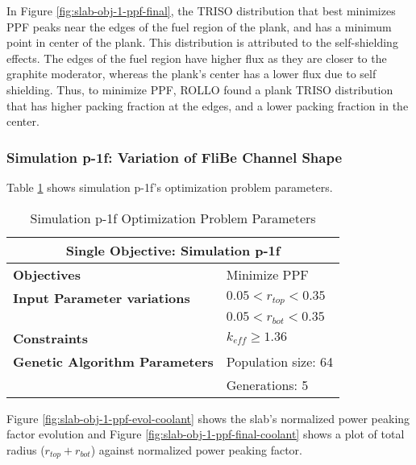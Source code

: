 In Figure \ref{fig:slab-obj-1-ppf-final}, the TRISO distribution that best minimizes 
PPF peaks near the edges of the fuel region of the plank, and has a minimum point in 
center of the plank.
This distribution is attributed to the self-shielding effects. 
The edges of the fuel region have higher flux as they are closer to the graphite 
moderator, whereas the plank's center has a lower flux due to self shielding. 
Thus, to minimize PPF, \gls{ROLLO} found a plank TRISO distribution that has higher 
packing fraction at the edges, and a lower packing fraction in the center. 

\subsubsection{Simulation p-1f: Variation of FliBe Channel Shape}
Table \ref{tab:simulationp1f} shows simulation p-1f's optimization problem parameters. 
\begin{table}[htbp]
    \centering
    \onehalfspacing
    \caption{Simulation p-1f Optimization Problem Parameters}
	\label{tab:simulationp1f}
    \footnotesize
    \begin{tabular}{l|p{3cm}}
    \hline 
    \multicolumn{2}{c}{\textbf{Single Objective: Simulation p-1f}} \\
    \hline 
    \textbf{Objectives} & Minimize PPF \\
    \hline 
    \textbf{Input Parameter variations} & $0.05<r_{top}<0.35$ \\
    & $0.05<r_{bot}<0.35$ \\
    \hline
    \textbf{Constraints} & $k_{eff} \geq 1.36$\\ 
    \hline 
    \textbf{Genetic Algorithm Parameters} & Population size: 64 \\
    & Generations: 5 \\
    \hline
    \end{tabular}
\end{table}
Figure \ref{fig:slab-obj-1-ppf-evol-coolant} shows the slab's normalized power peaking 
factor evolution and Figure \ref{fig:slab-obj-1-ppf-final-coolant} shows a plot of total 
radius ($r_{top} + r_{bot}$) against normalized power peaking factor. 
